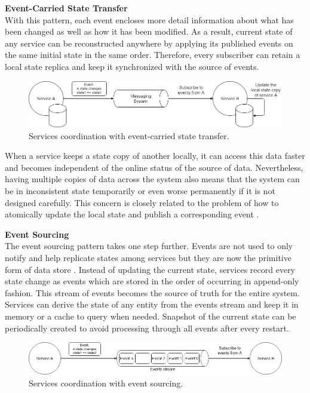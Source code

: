 \textbf{Event-Carried State Transfer}\\
With this pattern, each event encloses more detail information about what has been changed as well as how it has been modified. As a result, current state of any service can be reconstructed anywhere by applying its published events on the same initial state in the same order. Therefore, every subscriber can retain a local state replica and keep it synchronized with the source of events.

\begin{figure}[h]
	\includegraphics[width=\linewidth]{images/eventstatetransfer.png}
	\caption{Services coordination with event-carried state transfer.}
	\label{fig:eventstatetransfer}
\end{figure}

When a service keeps a state copy of another locally, it can access this data faster and becomes independent of the online status of the source of data. Nevertheless, having multiple copies of data across the system also means that the system can be in inconsistent state temporarily or even worse permanently if it is not designed carefully. This concern is closely related to the problem of how to atomically update the local state and publish a corresponding event \cite{eventstatetransferproblem}.

\textbf{Event Sourcing}\\
The event sourcing pattern takes one step further. Events are not used to only notify and help replicate states among services but they are now the primitive form of data store \cite{eventsourcingfowler}. Instead of updating the current state, services record every state change as events which are stored in the order of occurring in append-only fashion. This stream of events becomes the source of truth for the entire system. Services can derive the state of any entity from the events stream and keep it in memory or a cache to query when needed. Snapshot of the current state can be periodically created to avoid processing through all events after every restart.

\begin{figure}[h]
	\includegraphics[width=\linewidth]{images/eventsourcing.png}
	\caption{Services coordination with event sourcing.}
	\label{fig:eventsourcing}
\end{figure}

